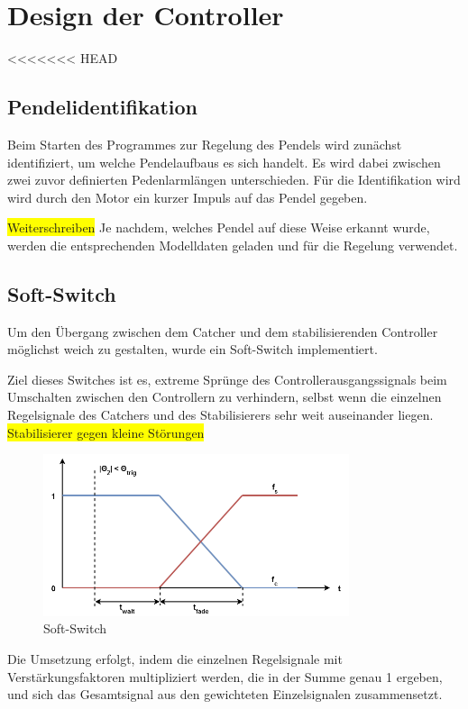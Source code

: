 \section{Design der Controller}
<<<<<<< HEAD
\subsection{Pendelidentifikation}
Beim Starten des Programmes zur Regelung des Pendels wird zunächst identifiziert, um welche Pendelaufbaus es sich handelt. Es wird dabei zwischen zwei zuvor definierten Pedenlarmlängen unterschieden.
Für die Identifikation wird wird durch den Motor ein kurzer Impuls auf das Pendel gegeben. 

\colorbox{yellow}{Weiterschreiben}
Je nachdem, welches Pendel auf diese Weise erkannt wurde, werden die entsprechenden Modelldaten geladen und für die Regelung verwendet.

\subsection{Soft-Switch}
Um den Übergang zwischen dem Catcher und dem stabilisierenden Controller möglichst weich zu gestalten, wurde ein Soft-Switch implementiert.

Ziel dieses Switches ist es, extreme Sprünge des Controllerausgangssignals beim Umschalten zwischen den Controllern zu verhindern, selbst wenn die einzelnen Regelsignale des Catchers und des Stabilisierers sehr weit auseinander liegen.
\colorbox{yellow}{Stabilisierer gegen kleine Störungen}
\begin{figure}[htbp]
	\centering	
	\label{fig.furuta-schematic}
	\includegraphics[width=0.8\textwidth]{Grafiken/SoftSwitch.png}
	\caption{Soft-Switch}
\end{figure}

Die Umsetzung erfolgt, indem die einzelnen Regelsignale mit Verstärkungsfaktoren multipliziert werden, die in der Summe genau 1 ergeben, und sich das Gesamtsignal aus den gewichteten Einzelsignalen zusammensetzt.


